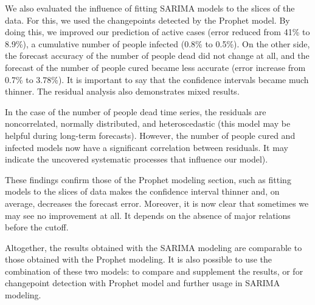 We also evaluated the influence of fitting SARIMA models to the slices of the data. For this, we used the changepoints detected by the Prophet model. By doing this, we improved our prediction of active cases (error reduced from 41\% to 8.9\%), a cumulative number of people infected (0.8\% to 0.5\%). On the other side, the forecast accuracy of the number of people dead did not change at all, and the forecast of the number of people cured became less accurate (error increase from 0.7\% to 3.78\%).
It is important to say that the confidence intervals became much thinner. The residual analysis also demonstrates mixed results. 

In the case of the number of people dead time series, the residuals are noncorrelated, normally distributed, and heteroscedastic (this model may be helpful during long-term forecasts). However, the number of people cured and infected models now have a significant correlation between residuals. It may indicate the uncovered systematic processes that influence our model). 

These findings confirm those of the Prophet modeling section, such as fitting models to the slices of data makes the confidence interval thinner and, on average, decreases the forecast error. Moreover, it is now clear that sometimes we may see no improvement at all. It depends on the absence of major relations before the cutoff. 

Altogether, the results obtained with the SARIMA modeling are comparable to those obtained with the Prophet modeling. It is also possible to use the combination of these two models: to compare and supplement the results, or for changepoint detection with Prophet model and further usage in SARIMA modeling.